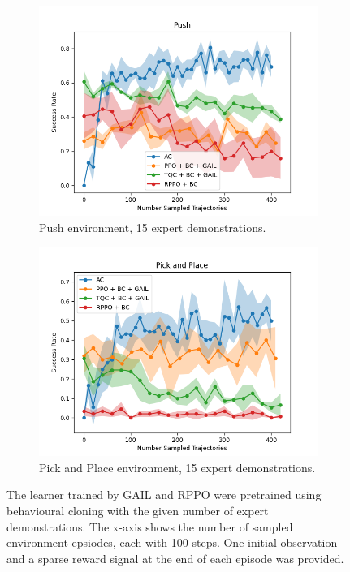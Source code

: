 \begin{figure}[htbp]
\begin{subfigure}[t]{0.45\textwidth}
      \includegraphics[width=\textwidth]{images/FineTuning/Push.png}
      \caption{Push environment, 15 expert demonstrations.}
      \label{fig:plot2}
    \end{subfigure}
    \begin{subfigure}[t]{0.45\textwidth}
      \includegraphics[width=\textwidth]{images/FineTuning/Pick and Place.png}
      \caption{Pick and Place environment, 15 expert demonstrations.}
      \label{fig:plot4}
    \end{subfigure}
    \caption{
    The learner trained by GAIL and RPPO were pretrained using behavioural cloning with the given number of expert demonstrations. 
    The x-axis shows the number of sampled environment epsiodes, each with 100 steps.  One initial observation and a sparse reward signal at the end of each episode was provided.}
    \label{fig:finetuning}
\end{figure}



